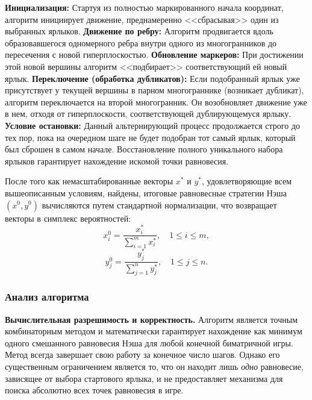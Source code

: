 \begin{algorithm}[H]
\caption{Алгоритм Лемке-Хаусона: базовая схема итераций}
\begin{algorithmic}[1]
    \State \textbf{Инициализация:} Стартуя из полностью маркированного начала координат, алгоритм инициирует движение, преднамеренно <<сбрасывая>> один из выбранных ярлыков.
    \State \textbf{Движение по ребру:} Алгоритм продвигается вдоль образовавшегося одномерного ребра внутри одного из многогранников до пересечения с новой гиперплоскостью.
    \State \textbf{Обновление маркеров:} При достижении этой новой вершины алгоритм <<подбирает>> соответствующий ей новый ярлык.
    \State \textbf{Переключение (обработка дубликатов):} Если подобранный ярлык уже присутствует у текущей вершины в парном многограннике (возникает дубликат), алгоритм переключается на второй многогранник. Он возобновляет движение уже в нем, отходя от гиперплоскости, соответствующей дублирующемуся ярлыку.
    \State \textbf{Условие остановки:} Данный альтернирующий процесс продолжается строго до тех пор, пока на очередном шаге не будет подобран тот самый ярлык, который был сброшен в самом начале. Восстановление полного уникального набора ярлыков гарантирует нахождение искомой точки равновесия.
\end{algorithmic}
\end{algorithm}

После того как немасштабированные векторы $x^*$ и $y^*$, удовлетворяющие всем вышеописанным условиям, найдены, итоговые равновесные стратегии Нэша $(x^0, y^0)$ вычисляются путем стандартной нормализации, что возвращает векторы в симплекс вероятностей:
\begin{equation}
x_i^0 = \frac{x_i^*}{\sum_{i=1}^m x_i^*}, \quad 1 \leqslant i \leqslant m,
\end{equation}
\begin{equation}
y_j^0 = \frac{y_j^*}{\sum_{j=1}^n y_j^*}, \quad 1 \leqslant j \leqslant n.
\end{equation}

\subsubsection{Анализ алгоритма}

\textbf{Вычислительная разрешимость и корректность.} Алгоритм является точным комбинаторным методом и математически гарантирует нахождение как минимум одного смешанного равновесия Нэша для любой конечной биматричной игры. Метод всегда завершает свою работу за конечное число шагов. Однако его существенным ограничением является то, что он находит лишь \textit{одно} равновесие, зависящее от выбора стартового ярлыка, и не предоставляет механизма для поиска абсолютно всех точек равновесия в игре.

